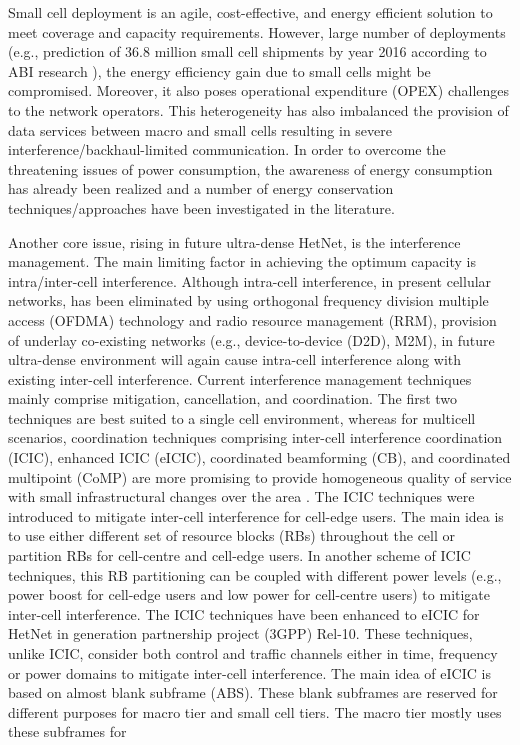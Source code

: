 \documentclass[article,10pt,twocolumn]{IEEEtran}
\begin{document}
Small cell deployment is an agile, cost-effective, and energy efficient solution to meet coverage and capacity requirements. However, large number of deployments (e.g., prediction of 36.8 million small cell shipments by year 2016 according to ABI research \citep{ABI}), the energy efficiency gain due to small cells might be compromised. Moreover, it also poses operational expenditure (OPEX) challenges to the network operators. This heterogeneity has also imbalanced the provision of data services between macro and small cells resulting in severe interference/backhaul-limited communication. In order to overcome the threatening issues of power consumption, the awareness of energy consumption has already been realized and a number of energy conservation techniques/approaches have been investigated in the literature.

Another core issue, rising in future ultra-dense HetNet, is the interference management. The main limiting factor in achieving the optimum capacity is intra/inter-cell interference. Although intra-cell interference, in present cellular networks, has been eliminated by using orthogonal frequency division multiple access (OFDMA) technology and radio resource management (RRM), provision of underlay co-existing networks (e.g., device-to-device (D2D), M2M), in future ultra-dense environment will again cause intra-cell interference along with existing inter-cell interference. Current interference management techniques mainly comprise mitigation, cancellation, and coordination. The first two techniques are best suited to a single cell environment, whereas for multicell scenarios, coordination techniques comprising inter-cell interference coordination (ICIC), enhanced ICIC (eICIC), coordinated beamforming (CB), and coordinated multipoint (CoMP) are more promising to provide homogeneous quality of service with small infrastructural changes over the area \citep{4117538}. The ICIC techniques were introduced to mitigate inter-cell interference for cell-edge users. The main idea is to use either different set of resource blocks (RBs) throughout the cell or partition RBs for cell-centre and cell-edge users. In another scheme of ICIC techniques, this RB partitioning can be coupled with different power levels (e.g., power boost for cell-edge users and low power for cell-centre users) to mitigate inter-cell interference. The ICIC techniques have been enhanced to eICIC for HetNet in  generation partnership project (3GPP)  Rel-10. These techniques, unlike ICIC, consider both control and traffic channels either in time, frequency or power domains to mitigate inter-cell interference. The main idea of eICIC is based on almost blank subframe (ABS). These blank subframes are reserved for different purposes for macro tier and  small cell tiers. The macro tier mostly uses these subframes for 
\end{document}
